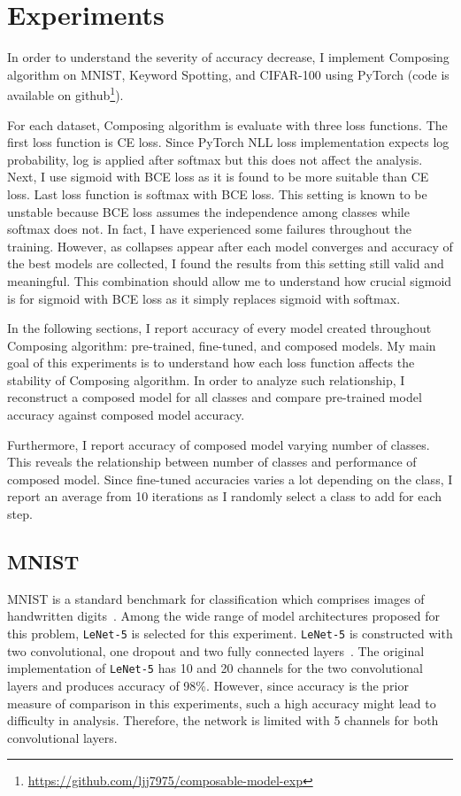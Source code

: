 \documentclass{article}
\begin{document}
\section{Experiments}

In order to understand the severity of accuracy decrease, I implement Composing algorithm on MNIST, Keyword Spotting, and CIFAR-100 using PyTorch (code is available on github\footnote{\url{https://github.com/ljj7975/composable-model-exp}}).

For each dataset, Composing algorithm is evaluate with three loss functions. The first loss function is CE loss. Since PyTorch NLL loss implementation expects log probability, log is applied after softmax but this does not affect the analysis. Next, I use sigmoid with BCE loss as it is found to be more suitable than CE loss. Last loss function is softmax with BCE loss. This setting is known to be unstable because BCE loss assumes the independence among classes while softmax does not. In fact, I have experienced some failures throughout the training. However, as collapses appear after each model converges and accuracy of the best models are collected, I found the results from this setting still valid and meaningful. This combination should allow me to understand how crucial sigmoid is for sigmoid with BCE loss as it simply replaces sigmoid with softmax.

In the following sections, I report accuracy of every model created throughout Composing algorithm: pre-trained, fine-tuned, and composed models. My main goal of this experiments is to understand how each loss function affects the stability of Composing algorithm. In order to analyze such relationship, I reconstruct a composed model for all classes and compare pre-trained model accuracy against composed model accuracy.

Furthermore, I report accuracy of composed model varying number of classes. This reveals the relationship between number of classes and performance of composed model. Since fine-tuned accuracies varies a lot depending on the class, I report an average from 10 iterations as I randomly select a class to add for each step.

\subsection{MNIST}

MNIST is a standard benchmark for classification which comprises images of handwritten digits~\cite{lecun1998gradient}. Among the wide range of model architectures proposed for this problem, \texttt{LeNet-5} is selected for this experiment. \texttt{LeNet-5} is constructed with two convolutional, one dropout and two fully connected layers~\cite{lecun2015lenet}. The original implementation of \texttt{LeNet-5} has 10 and 20 channels for the two convolutional layers and produces accuracy of 98\%. However, since accuracy is the prior measure of comparison in this experiments, such a high accuracy might lead to difficulty in analysis. Therefore, the network is limited with 5 channels for both convolutional layers.
\end{document}
